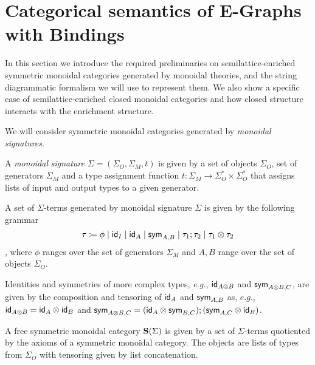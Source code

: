 \section{Categorical semantics of E-Graphs with Bindings}

In this section we introduce the required preliminaries on semilattice-enriched symmetric monoidal categories generated by monoidal theories, and the string diagrammatic formalism we will use to represent them.
We also show a specific case of semilattice-enriched closed monoidal categories and how closed structure interacts with the enrichment structure.

We will consider symmetric monoidal categories generated by \textit{monoidal signatures}.

\begin{definition}

A \textit{monoidal} \textit{signature} $\Sigma = (\Sigma_{O}, \Sigma_{M}, t)$ is given by a set of objects $\Sigma_{O}$, set of generators $\Sigma_{M}$ and a type assignment function $t : \Sigma_{M} \to \Sigma_{O}^{*} \times \Sigma_{O}^{*}$ that assigns lists of input and output types to a given generator.
\end{definition}

\begin{definition}

A set of $\Sigma$-terms generated by monoidal signature $\Sigma$ is given by the following grammar
\[
\tau \coloneq \phi \;|\; \textsf{id}_{I} \;|\; \textsf{id}_{A} \;|\; \textsf{sym}_{A,B} \;|\; \tau_{1};\tau_{2} \;|\; \tau_{1} \otimes \tau_{2}
\],
where $\phi$ ranges over the set of generators $\Sigma_{M}$ and $A,B$ range over the set of objects $\Sigma_{O}$.
\end{definition}

Identities and symmetries of more complex types, \textit{e.g.}, $\textsf{id}_{A \otimes B}$ and $\textsf{sym}_{A \otimes B, C}$, are given by the composition and tensoring of $\textsf{id}_{A}$ and $\textsf{sym}_{A,B}$ as, $\textit{e.g.}$, $\textsf{id}_{A \otimes B} = \textsf{id}_{A} \otimes \textsf{id}_{B}$ and $\textsf{sym}_{A \otimes B, C} = (\textsf{id}_{A} \otimes \textsf{sym}_{B,C});(\textsf{sym}_{A,C} \otimes \textsf{id}_{B})$.

\begin{definition}
A free symmetric monoidal category $\mathbf{S}(\Sigma)$ is given by a set of $\Sigma$-terms quotiented by the axioms of a symmetric monoidal category.
The objects are lists of types from $\Sigma_{O}$ with tensoring given by list concatenation.
\end{definition}

